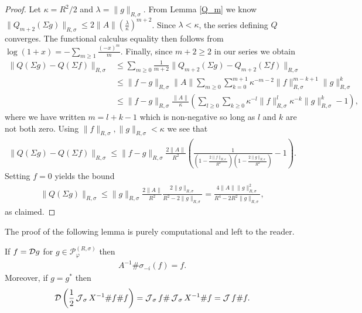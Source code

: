 \begin{proof}
Let $\kappa=R^2/2$ and $\lambda = \|g\|_{R,\sigma}$. From Lemma \ref{Q_m} we know $\|Q_{m+2}(\Sigma g)\|_{R,\sigma} \leq  2\|A\| \left(\frac{\lambda}{\kappa}\right)^{m+2}$. Since $\lambda<\kappa$, the series defining $Q$ converges. The functional calculus equality then follows from $\log(1+x)=-\sum_{m\geq 1} \frac{(-x)^m}{m}$. Finally, since $m+2\geq 2$ in our series we obtain
	\begin{align*}
		\| Q(\Sigma g) - Q(\Sigma f)\|_{R,\sigma} &\leq \sum_{m\geq 0} \frac{1}{m+2} \| Q_{m+2}(\Sigma g) - Q_{m+2}(\Sigma f)\|_{R,\sigma}\\
								&\leq \|f-g\|_{R,\sigma} \|A\| \sum_{m\geq 0} \sum_{k=0}^{m+1} \kappa^{-m-2}\|f\|_{R,\sigma}^{m-k+1}\|g\|_{R,\sigma}^k\\
								&\leq \|f -g\|_{R,\sigma} \frac{\|A\| }{\kappa} \left( \sum_{l\geq 0}\sum_{k\geq 0} \kappa^{-l}\|f\|_{R,\sigma}^l \kappa^{-k} \|g\|_{R,\sigma}^k - 1\right),
	\end{align*}
where we have written $m=l+k-1$ which is non-negative so long as $l$ and $k$ are not both zero. Using $\|f\|_{R,\sigma}, \|g\|_{R,\sigma} < \kappa$ we see that
	\begin{align*}
		\| Q(\Sigma g) - Q(\Sigma f)\|_{R,\sigma} \leq \| f- g\|_{R,\sigma} \frac{2\|A\|}{R^2}\left( \frac{1}{\left(1-\frac{2\|f\|_{R,\sigma}}{R^2}\right)\left(1-\frac{2\|g\|_{R,\sigma}}{R^2}\right)} - 1\right).
	\end{align*}
Setting $f=0$ yields the bound
	\begin{align*}
		\|Q(\Sigma g)\|_{R,\sigma}\leq \|g\|_{R,\sigma} \frac{2\|A\|}{R^2} \frac{2\|g\|_{R,\sigma}}{R^2-2\|g\|_{R,\sigma}} = \frac{ 4\|A\| \|g\|_{R,\sigma}^2}{R^4-2R^2 \|g\|_{R,\sigma}},
	\end{align*}
as claimed.
\end{proof}

The proof of the following lemma is purely computational and left to the reader.

\begin{lem}
If $f=\mathcal D g$ for $g\in \mathscr{P}_\varphi^{(R,\sigma)}$ then 
	\begin{align}\label{eigenvalue_f}
		A^{-1}\# \sigma_{-i}(f)=f.
	\end{align}
Moreover, if $g=g^*$ then
	\begin{align}\label{dot_product_to_vector_product}
		\mathcal D\left( \frac{1}{2}\operatorname{\mathcal J}_\sigma X^{-1}\# f\# f\right)=\operatorname{\mathcal J}_\sigma f\# \operatorname{\mathcal J}_\sigma X^{-1}\# f=\operatorname{\mathcal J} f\# f.
	\end{align}
\end{lem}


